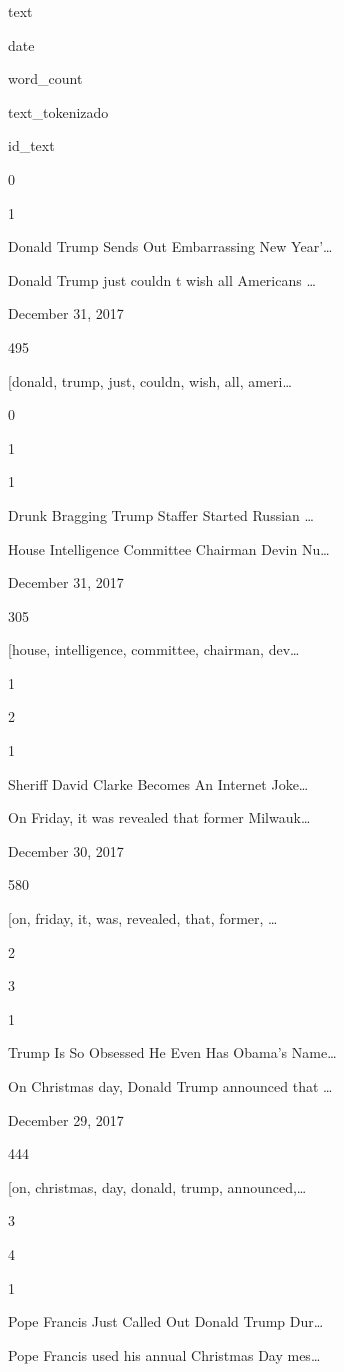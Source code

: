 \documentclass[
  11pt,
  a4paper,
]{article}
\begin{document}
text

date

word\_count

text\_tokenizado

id\_text

0

1

Donald Trump Sends Out Embarrassing New Year'\ldots{}

Donald Trump just couldn t wish all Americans \ldots{}

December 31, 2017

495

{[}donald, trump, just, couldn, wish, all, ameri\ldots{}

0

1

1

Drunk Bragging Trump Staffer Started Russian \ldots{}

House Intelligence Committee Chairman Devin Nu\ldots{}

December 31, 2017

305

{[}house, intelligence, committee, chairman, dev\ldots{}

1

2

1

Sheriff David Clarke Becomes An Internet Joke\ldots{}

On Friday, it was revealed that former Milwauk\ldots{}

December 30, 2017

580

{[}on, friday, it, was, revealed, that, former, \ldots{}

2

3

1

Trump Is So Obsessed He Even Has Obama's Name\ldots{}

On Christmas day, Donald Trump announced that \ldots{}

December 29, 2017

444

{[}on, christmas, day, donald, trump, announced,\ldots{}

3

4

1

Pope Francis Just Called Out Donald Trump Dur\ldots{}

Pope Francis used his annual Christmas Day mes\ldots{}
\end{document}

